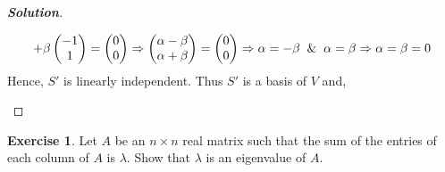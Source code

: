 \documentclass[10pt]{scrartcl}
\theoremstyle{definition}
\newtheorem{exercise}{Exercise}
\newenvironment{solution} {\begin{proof}[\normalfont \textbf{Solution}]} {\end{proof}}
\begin{document}
\begin{solution}
\begin{enumerate}[label={(\roman*)}]
\begin{gather*}
                + \beta
                \begin{pmatrix}
                    -1 \\ 
                    1 
                \end{pmatrix}
                =
                \begin{pmatrix}
                    0 \\ 
                    0 
                \end{pmatrix}
                \Rightarrow
                \begin{pmatrix}
                    \alpha - \beta \\ 
                    \alpha + \beta 
                \end{pmatrix}
                =
                \begin{pmatrix}
                    0 \\ 
                    0 
                \end{pmatrix}
                \Rightarrow
                \alpha = -\beta \And \alpha = \beta
                \Rightarrow
                \alpha = \beta = 0
            \end{gather*}
            Hence, $S'$ is linearly independent. Thus $S'$ is a basis of $V$ and,
    \end{enumerate}
\end{solution}
\begin{exercise}
    Let $A$ be an $n \times n$ real matrix such that the sum of the entries of each column of $A$ is $\lambda$. Show that $\lambda$ is an eigenvalue of $A$.
\end{exercise}
\end{document}
